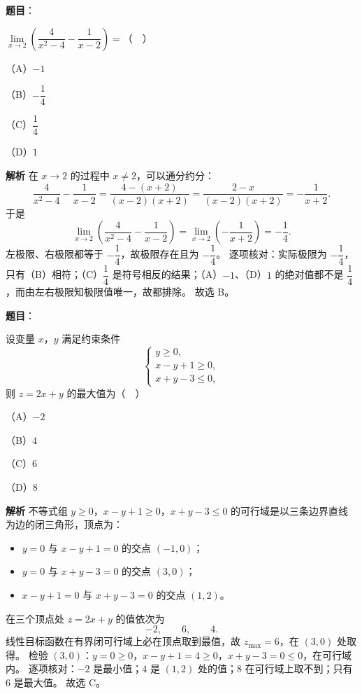 \begin{answer}

\textbf{题目}：

$\lim\limits_{x\to2}\left(\dfrac{4}{x^2-4}-\dfrac{1}{x-2}\right)=$（　）

（A）$-1$

（B）$-\dfrac14$

（C）$\dfrac14$

（D）$1$

\textbf{解析}
在 $x\to2$ 的过程中 $x\neq2$，可以通分约分：
\nopagebreak[4]
\[\frac{4}{x^2-4}-\frac{1}{x-2}=\frac{4-(x+2)}{(x-2)(x+2)}=\frac{2-x}{(x-2)(x+2)}=-\frac{1}{x+2}.\]
于是
\nopagebreak[4]
\[\lim_{x\to2}\left(\frac{4}{x^2-4}-\frac{1}{x-2}\right)=\lim_{x\to2}\left(-\frac{1}{x+2}\right)=-\frac14.\]
左极限、右极限都等于 $-\dfrac14$，故极限存在且为 $-\dfrac14$。
逐项核对：实际极限为 $-\dfrac14$，只有（B）相符；（C）$\dfrac14$ 是符号相反的结果；（A）$-1$、（D）$1$ 的绝对值都不是 $\dfrac14$，而由左右极限知极限值唯一，故都排除。
故选 B。


\end{answer}
\begin{answer}

\textbf{题目}：

设变量 $x$，$y$ 满足约束条件
\nopagebreak[4]
\[\begin{cases}y\geqslant0,\\x-y+1\geqslant0,\\x+y-3\leqslant0,\end{cases}\]
则 $z=2x+y$ 的最大值为（　）

（A）$-2$

（B）$4$

（C）$6$

（D）$8$

\textbf{解析}
不等式组 $y\geqslant0$，$x-y+1\geqslant0$，$x+y-3\leqslant0$ 的可行域是以三条边界直线为边的闭三角形，顶点为：
\begin{itemize}
\item $y=0$ 与 $x-y+1=0$ 的交点 $\left(-1,0\right)$；
\item $y=0$ 与 $x+y-3=0$ 的交点 $\left(3,0\right)$；
\item $x-y+1=0$ 与 $x+y-3=0$ 的交点 $\left(1,2\right)$。
\end{itemize}

在三个顶点处 $z=2x+y$ 的值依次为
\nopagebreak[4]
\[-2,\qquad 6,\qquad 4.\]
线性目标函数在有界闭可行域上必在顶点取到最值，故 $z_{\max}=6$，在 $\left(3,0\right)$ 处取得。
检验 $\left(3,0\right)$：$y=0\geqslant0$，$x-y+1=4\geqslant0$，$x+y-3=0\leqslant0$，在可行域内。
逐项核对：$-2$ 是最小值；$4$ 是 $\left(1,2\right)$ 处的值；$8$ 在可行域上取不到；只有 $6$ 是最大值。
故选 C。


\end{answer}
